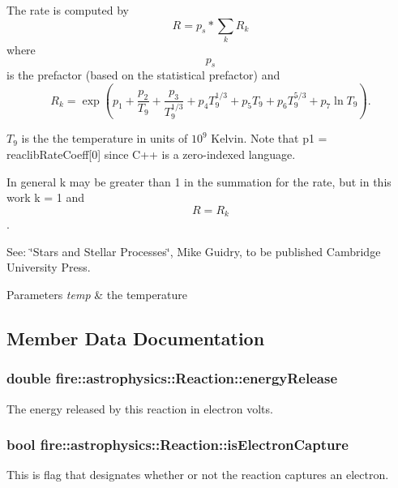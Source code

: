 The rate is computed by \[ R = p_s*\sum_k R_k \] where \[p_s\] is the prefactor (based on the statistical prefactor) and \[ R_k = \exp(p_1 + \frac{p_2}{T_9} + \frac{p_3}{T_9^{1/3}} + p_{4}T_9^{1/3} + p_{5}T_9 + p_{6}T_9^{5/3} + p_{7}\ln T_9). \]

$T_9$ is the the temperature in units of $10^9$ Kelvin. Note that p1 = reaclib\+Rate\+Coeff\mbox{[}0\mbox{]} since C++ is a zero-\/indexed language.

In general k may be greater than 1 in the summation for the rate, but in this work k = 1 and \[R = R_k\].

See\+: \char`\"{}\+Stars and Stellar Processes\char`\"{}, Mike Guidry, to be published Cambridge University Press.


\begin{DoxyParams}{Parameters}
{\em temp} & the temperature \\
\hline
\end{DoxyParams}


\subsection{Member Data Documentation}
\hypertarget{a00033_a07f4db35c5d9bca2d5c5fc8529ec3801}{}
\subsubsection[{energy\+Release}]{\setlength{\rightskip}{0pt plus 5cm}double fire\+::astrophysics\+::\+Reaction\+::energy\+Release}\label{a00033_a07f4db35c5d9bca2d5c5fc8529ec3801}
The energy released by this reaction in electron volts. \hypertarget{a00033_a84165249a444a64bdfc41531fbe81cc0}{}
\subsubsection[{is\+Electron\+Capture}]{\setlength{\rightskip}{0pt plus 5cm}bool fire\+::astrophysics\+::\+Reaction\+::is\+Electron\+Capture}\label{a00033_a84165249a444a64bdfc41531fbe81cc0}
This is flag that designates whether or not the reaction captures an electron. \hypertarget{a00033_ae161628da753400b3d2256e2d10a02b9}{}
